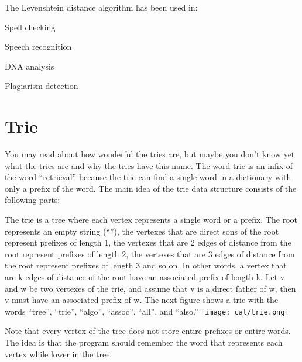 \documentclass{article}
\begin{document}
The Levenshtein distance algorithm has been used in:

Spell checking

Speech recognition

DNA analysis

Plagiarism detection

\begin{framed}

\end{framed}
\newpage
\section{Trie}
You may read about how wonderful the tries are, but maybe you don’t know yet what the tries are and why the tries have this name. The word trie is an infix of the word “retrieval” because the trie can find a single word in a dictionary with only a prefix of the word. The main idea of the trie data structure consists of the following parts:

The trie is a tree where each vertex represents a single word or a prefix.
The root represents an empty string (“”), the vertexes that are direct sons of the root represent prefixes of length 1, the vertexes that are 2 edges of distance from the root represent prefixes of length 2, the vertexes that are 3 edges of distance from the root represent prefixes of length 3 and so on. In other words, a vertex that are k edges of distance of the root have an associated prefix of length k.
Let v and w be two vertexes of the trie, and assume that v is a direct father of w, then v must have an associated prefix of w.
The next figure shows a trie with the words “tree”, “trie”, “algo”, “assoc”, “all”, and “also.”
\texttt{[image: cal/trie.png]}

Note that every vertex of the tree does not store entire prefixes or entire words. The idea is that the program should remember the word that represents each vertex while lower in the tree.
\end{document}
